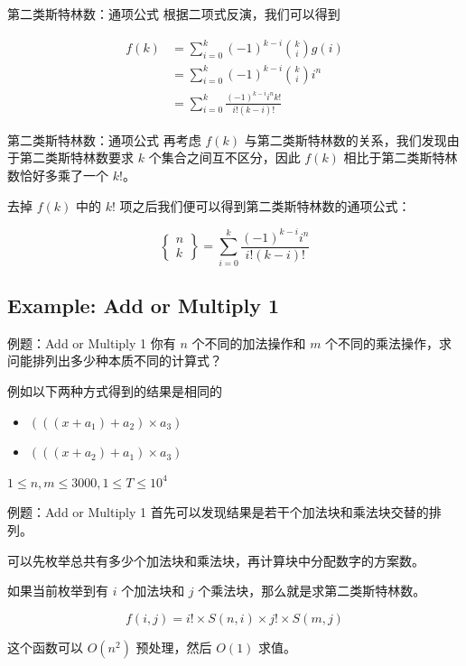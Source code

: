 \documentclass[12pt,aspectratio=169]{beamer}
\begin{document}
\begin{frame}[fragile]{第二类斯特林数：通项公式}
根据二项式反演，我们可以得到

$$
\begin{aligned}
f(k) &= \sum_{i=0}^{k} (-1)^{k-i} {k \choose i} g(i) \\
     &= \sum_{i=0}^{k} (-1)^{k-i} {k \choose i} i^n \\
     &= \sum_{i=0}^{k} \frac{(-1)^{k-i} i^n k!}{i! (k-i)!}
\end{aligned}
$$
\end{frame}

\begin{frame}[fragile]{第二类斯特林数：通项公式}
再考虑 $f(k)$ 与第二类斯特林数的关系，我们发现由于第二类斯特林数要求 $k$ 个集合之间互不区分，因此 $f(k)$ 相比于第二类斯特林数恰好多乘了一个 $k!$。

去掉 $f(k)$ 中的 $k!$ 项之后我们便可以得到第二类斯特林数的通项公式：

$$
\begin{Bmatrix}n\\ k\end{Bmatrix} = \sum_{i=0}^{k} \frac{(-1)^{k-i} i^n}{i! (k-i)!}
$$
\end{frame}

\subsection[例题：Add or Multiply 1]{Example: Add or Multiply 1}

\begin{frame}[fragile]{例题：Add or Multiply 1}
  你有 $n$ 个不同的加法操作和 $m$ 个不同的乘法操作，求问能排列出多少种本质不同的计算式？

  例如以下两种方式得到的结果是相同的

  \begin{itemize}
    \item $(((x + a_1) + a_2) \times a_3)$
    \item $(((x + a_2) + a_1) \times a_3)$
  \end{itemize}

  $1 \le n, m \le 3000, 1 \le T \le 10^4$
\end{frame}

\begin{frame}[fragile]{例题：Add or Multiply 1}
  首先可以发现结果是若干个加法块和乘法块交替的排列。

  可以先枚举总共有多少个加法块和乘法块，再计算块中分配数字的方案数。

  如果当前枚举到有 $i$ 个加法块和 $j$ 个乘法块，那么就是求第二类斯特林数。

  $$
  f(i, j) = i! \times S(n, i) \times j! \times S(m, j) 
  $$

  这个函数可以 $O(n^2)$ 预处理，然后 $O(1)$ 求值。
\end{frame}
\end{document}
